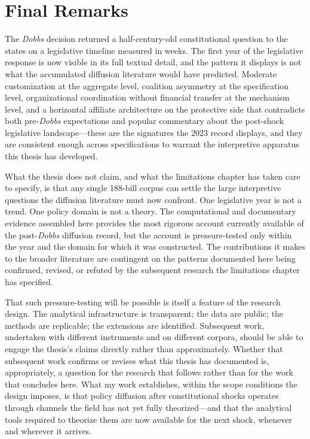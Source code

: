 \section{Final Remarks}
 
The \textit{Dobbs} decision returned a half-century-old constitutional question to the states on a legislative timeline measured in weeks. The first year of the legislative response is now visible in its full textual detail, and the pattern it displays is not what the accumulated diffusion literature would have predicted. Moderate customization at the aggregate level, coalition asymmetry at the specification level, organizational coordination without financial transfer at the mechanism level, and a horizontal affiliate architecture on the protective side that contradicts both pre-\textit{Dobbs} expectations and popular commentary about the post-shock legislative landscape---these are the signatures the 2023 record displays, and they are consistent enough across specifications to warrant the interpretive apparatus this thesis has developed.
 
What the thesis does not claim, and what the limitations chapter has taken care to specify, is that any single 188-bill corpus can settle the large interpretive questions the diffusion literature must now confront. One legislative year is not a trend. One policy domain is not a theory. The computational and documentary evidence assembled here provides the most rigorous account currently available of the post-\textit{Dobbs} diffusion record, but the account is pressure-tested only within the year and the domain for which it was constructed. The contributions it makes to the broader literature are contingent on the patterns documented here being confirmed, revised, or refuted by the subsequent research the limitations chapter has specified.
 
That such pressure-testing will be possible is itself a feature of the research design. The analytical infrastructure is transparent; the data are public; the methods are replicable; the extensions are identified. Subsequent work, undertaken with different instruments and on different corpora, should be able to engage the thesis's claims directly rather than approximately. Whether that subsequent work confirms or revises what this thesis has documented is, appropriately, a question for the research that follows rather than for the work that concludes here. What my work establishes, within the scope conditions the design imposes, is that policy diffusion after constitutional shocks operates through channels the field has not yet fully theorized---and that the analytical tools required to theorize them are now available for the next shock, whenever and wherever it arrives.